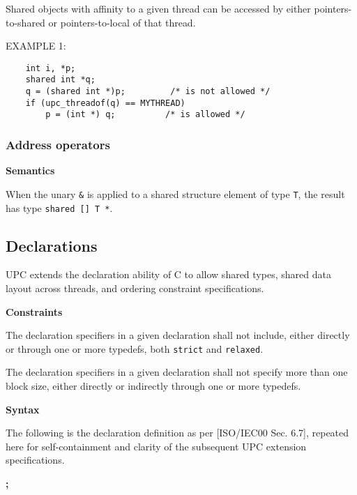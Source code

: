 \np Shared objects with affinity to a given thread can be
    accessed by either pointers-to-shared or pointers-to-local of
    that thread.

\np EXAMPLE 1: 
\begin{verbatim}
    int i, *p; 
    shared int *q; 
    q = (shared int *)p;         /* is not allowed */ 
    if (upc_threadof(q) == MYTHREAD)
        p = (int *) q;          /* is allowed */ 
\end{verbatim}

\subsubsection{Address operators}

{\bf Semantics} 

\npf When the unary {\tt \&} is applied to a shared structure
    element of type {\tt T}, the result has type {\tt shared [] T *}.

\subsection{Declarations}

\npf UPC extends the declaration ability of C to allow shared
     types, shared data layout across threads, and ordering constraint
     specifications.

{\bf Constraints} 

\np The declaration specifiers in a given declaration shall
     not include, either directly or through one or more typedefs,
     both {\tt strict} and {\tt relaxed}.

 
\np The declaration specifiers in a given declaration shall
     not specify more than one block size, either directly or
     indirectly through one or more typedefs.

{\bf Syntax} 

\np The following is the declaration definition as per
    [ISO/IEC00 Sec. 6.7], repeated here for self-containment and
    clarity of the subsequent UPC extension specifications.


 {\bf ;}



